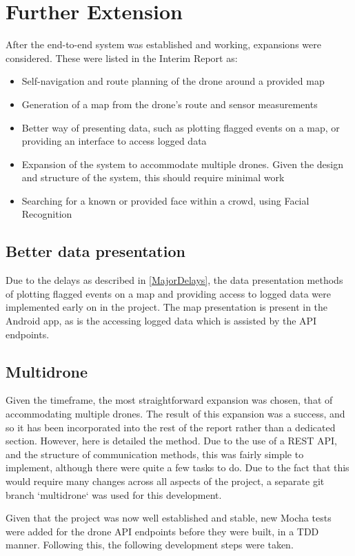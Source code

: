 \documentclass{article}
\begin{document}
\section{Further Extension}
After the end-to-end system was established and working, expansions were considered. These were listed in the Interim Report as:
\begin{itemize}
    \item Self-navigation and route planning of the drone around a provided map
    \item Generation of a map from the drone's route and sensor measurements
    \item Better way of presenting data, such as plotting flagged events on a map, or providing an interface to access logged data
    \item Expansion of the system to accommodate multiple drones. Given the design and structure of the system, this should require minimal work
    \item Searching for a known or provided face within a crowd, using Facial Recognition
\end{itemize}
\subsection{Better data presentation}
Due to the delays as described in \ref{MajorDelays}, the data presentation methods of plotting flagged events on a map and providing access to logged data were implemented early on in the project. The map presentation is present in the Android app, as is the accessing logged data which is assisted by the API endpoints. 

\subsection{Multidrone}
Given the timeframe, the most straightforward expansion was chosen, that of accommodating multiple drones. The result of this expansion was a success, and so it has been incorporated into the rest of the report rather than a dedicated section. However, here is detailed the method. Due to the use of a REST API, and the structure of communication methods, this was fairly simple to implement, although there were quite a few tasks to do. Due to the fact that this would require many changes across all aspects of the project, a separate git branch `multidrone` was used for this development. 

Given that the project was now well established and stable, new Mocha tests were added for the drone API endpoints before they were built, in a TDD manner. Following this, the following development steps were taken. 
\end{document}
